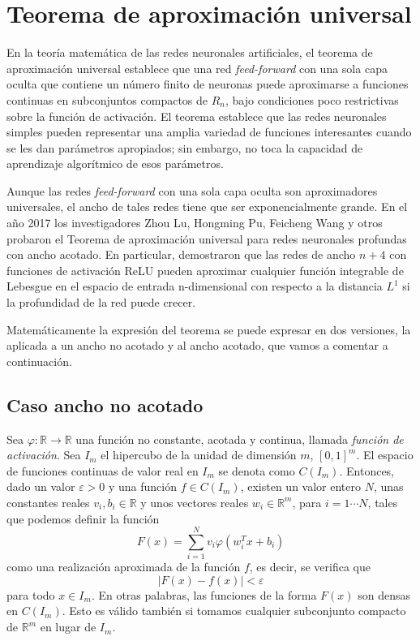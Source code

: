 \documentclass[
  a4paper,
  12pt,
  spanish,
]{scrartcl}
\theoremstyle{teorema-style}
\begin{document}
\begin{itemize}
\end{itemize}

\section{Teorema de aproximación universal}

En la teoría matemática de las redes neuronales artificiales, el teorema de aproximación universal establece que una red \textit{feed-forward} con una sola capa oculta que contiene un número finito de neuronas puede aproximarse a funciones continuas en subconjuntos compactos de $R_n$, bajo condiciones poco restrictivas sobre la función de activación. El teorema establece que las redes neuronales simples pueden representar una amplia variedad de funciones interesantes cuando se les dan parámetros apropiados; sin embargo, no toca la capacidad de aprendizaje algorítmico de esos parámetros.

Aunque las redes \textit{feed-forward} con una sola capa oculta son aproximadores universales, el ancho de tales redes tiene que ser exponencialmente grande. En el año 2017 los investigadores Zhou Lu, Hongming Pu, Feicheng Wang y otros \parencite{lu_expressive_2017} probaron el Teorema de aproximación universal para redes neuronales profundas con ancho acotado. En particular, demostraron que las redes de ancho $n + 4$ con funciones de activación ReLU pueden aproximar cualquier función integrable de Lebesgue en el espacio de entrada n-dimensional con respecto a la distancia $L ^ {1}$ si la profundidad de la red puede crecer.

Matemáticamente la expresión del teorema se puede expresar en dos versiones, la aplicada a un ancho no acotado y al ancho acotado, que vamos a comentar a continuación.

\subsection{Caso ancho no acotado}

Sea $\varphi:\mathbb{R} \rightarrow \mathbb{R}$ una función no constante, acotada y continua, llamada \textit{función de activación}. 
Sea $I_m$ el hipercubo de la unidad de dimensión $m$, $[0,1]^m$. 
El espacio de funciones continuas de valor real en $I_m$ se denota como $C(I_m)$. 
Entonces, dado un valor $\varepsilon > 0$ y una función $f \in C(I_m)$, existen un valor entero $N$, unas constantes reales $v_i , b_i \in \mathbb{R}$ y unos vectores reales $w_i \in \mathbb{R}^m$, para $i =1 \cdots N$, tales que podemos definir la función
\[ 
  F (x) = \sum_{{i = 1}}^{{N}} v_{i} \varphi \left (w_ {i} ^ {T} x + b_ {i} \right)
\]
como una realización aproximada de la función $f$, es decir, se verifica que
\[
  |F(x)-f(x)| < \varepsilon
\]
para todo \(x \in I_m\).
En otras palabras, las funciones de la forma $F(x)$ son densas en $C(I_m)$.
Esto es válido también si tomamos cualquier subconjunto compacto de $\mathbb{R}^m$ en lugar de $I_m$.
\end{document}
